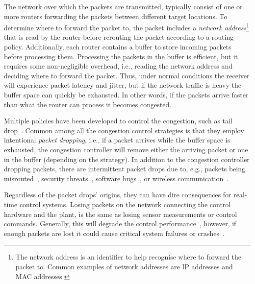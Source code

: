The network over which the packets are transmitted, typically consist of one or more routers forwarding the packets between different target locations.
To determine where to forward the packet to, the packet includes a \emph{network address}\footnote{The network address is an identifier to help recognise where to forward the packet to. Common examples of network addresses are IP addresses and MAC addresses.} that is read by the router before rerouting the packet according to a routing policy.
Additionally, each router contains a buffer to store incoming packets before processing them.
Processing the packets in the buffer is efficient, but it requires some non-negligible overhead, i.e., reading the network address and deciding where to forward the packet.
Thus, under normal conditions the receiver will experience packet latency and jitter, but if the network traffic is heavy the buffer space can quickly be exhausted.
In other words, if the packets arrive faster than what the router can process it becomes congested.

Multiple policies have been developed to control the congestion, such as tail drop~\addref{}.
Common among all the congestion control strategies is that they employ intentional \emph{packet dropping}, i.e., if a packet arrives while the buffer space is exhausted, the congestion controller will remove either the arriving packet or one in the buffer (depending on the strategy).
In addition to the congestion controller dropping packets, there are intermittent packet drops due to, e.g., packets being misrouted~\addref{}, security threats~\addref{}, software bugs~\addref{}, or wireless communication~\addref{}.

Regardless of the packet drops' origins, they can have dire consequences for real-time control systems.
Losing packets on the network connecting the control hardware and the plant, is the same as losing sensor measurements or control commands.
Generally, this will degrade the control performance~\addref{}, however, if enough packets are lost it could cause critical system failures or crashes~\addref{}.

